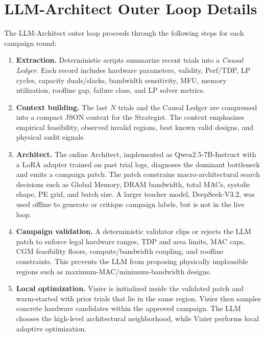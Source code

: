 \newpage


\section{LLM-Architect Outer Loop Details}
\label{app:llm_loop}
The LLM-Architect outer loop proceeds through the following steps for each campaign round:

\begin{enumerate}

\item \textbf{Extraction.} Deterministic scripts summarize recent trials
into a \emph{Causal Ledger}. Each record includes hardware parameters,
validity, Perf/TDP, LP cycles, capacity duals/slacks, bandwidth
sensitivity, MFU, memory utilization, roofline gap, failure class, and LP solver metrics.

\item \textbf{Context building.} The last $N$ trials and the Causal Ledger
are compressed into a compact JSON context for the Strategist. The context
emphasizes empirical feasibility, observed invalid regions, best known
valid designs, and physical audit signals.

\item \textbf{Architect.} The online Architect, implemented as
Qwen2.5-7B-Instruct with a LoRA adapter trained on past trial logs, diagnoses the dominant bottleneck and emits a campaign patch. The patch constrains macro-architectural search decisions such as Global Memory, DRAM bandwidth, total MACs, systolic shape,
PE grid, and batch size. A larger teacher model, DeepSeek-V3.2, was used offline to generate or critique campaign labels, but is not in the live loop.

\item \textbf{Campaign validation.} A deterministic validator clips or rejects the LLM patch to enforce legal hardware ranges, TDP and area limits, MAC caps, CGM feasibility floors, compute/bandwidth coupling, and roofline constraints. This prevents the LLM from proposing physically implausible regions such as maximum-MAC/minimum-bandwidth designs. 

\item \textbf{Local optimization.} Vizier is initialized inside the
validated patch and warm-started with prior trials that lie in the same region. Vizier then samples concrete hardware candidates within the approved campaign. The LLM chooses the high-level architectural neighborhood, while Vizier performs local adaptive optimization.


\end{enumerate}
